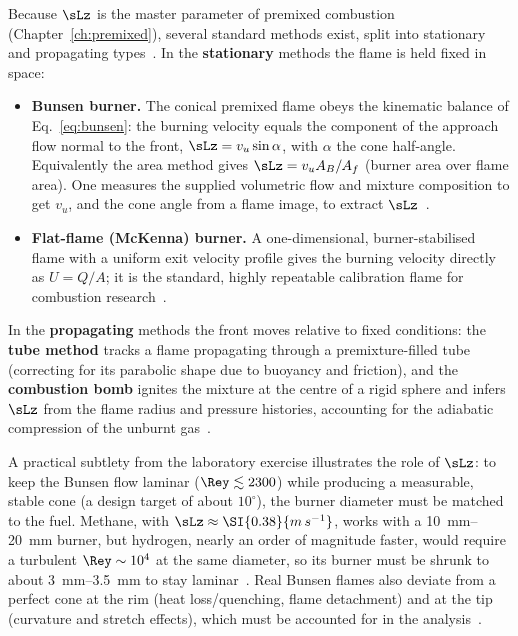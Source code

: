 Because $\sLz$ is the master parameter of premixed combustion (Chapter~\ref{ch:premixed}), several standard methods exist, split into stationary and propagating types~\cite{lecture5}. In the \textbf{stationary} methods the flame is held fixed in space:
\begin{itemize}[leftmargin=1.5em,itemsep=2pt]
\item \textbf{Bunsen burner.} The conical premixed flame obeys the kinematic balance of Eq.~\eqref{eq:bunsen}: the burning velocity equals the component of the approach flow normal to the front, $\sLz=v_u\sin\alpha$, with $\alpha$ the cone half-angle. Equivalently the area method gives $\sLz=v_u A_B/A_f$ (burner area over flame area). One measures the supplied volumetric flow and mixture composition to get $v_u$, and the cone angle from a flame image, to extract $\sLz$~\cite{lecture5,transcript_l7}.
\item \textbf{Flat-flame (McKenna) burner.} A one-dimensional, burner-stabilised flame with a uniform exit velocity profile gives the burning velocity directly as $U=Q/A$; it is the standard, highly repeatable calibration flame for combustion research~\cite{lecture5}.

\end{itemize}
In the \textbf{propagating} methods the front moves relative to fixed conditions: the \textbf{tube method} tracks a flame propagating through a premixture-filled tube (correcting for its parabolic shape due to buoyancy and friction), and the \textbf{combustion bomb} ignites the mixture at the centre of a rigid sphere and infers $\sLz$ from the flame radius and pressure histories, accounting for the adiabatic compression of the unburnt gas~\cite{lecture5}.

A practical subtlety from the laboratory exercise illustrates the role of $\sLz$: to keep the Bunsen flow laminar ($\Rey\lesssim2300$) while producing a measurable, stable cone (a design target of about $10^\circ$), the burner diameter must be matched to the fuel. Methane, with $\sLz\approx\SI{0.38}{m\,s^{-1}}$, works with a \SIrange{10}{20}{mm} burner, but hydrogen, nearly an order of magnitude faster, would require a turbulent $\Rey\sim10^4$ at the same diameter, so its burner must be shrunk to about \SIrange{3}{3.5}{mm} to stay laminar~\cite{transcript_l7}. Real Bunsen flames also deviate from a perfect cone at the rim (heat loss/quenching, flame detachment) and at the tip (curvature and stretch effects), which must be accounted for in the analysis~\cite{lecture5,transcript_l7}.

